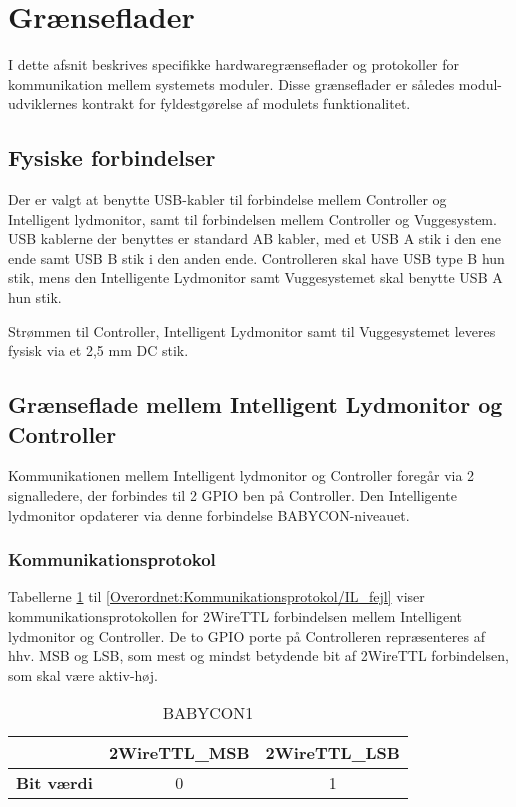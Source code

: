 \section{Grænseflader}
I dette afsnit beskrives specifikke hardwaregrænseflader og protokoller for kommunikation mellem systemets moduler. Disse grænseflader er således modul-udviklernes kontrakt for fyldestgørelse af modulets funktionalitet.

\subsection{Fysiske forbindelser}

Der er valgt at benytte USB-kabler til forbindelse mellem Controller og Intelligent lydmonitor, samt til forbindelsen mellem Controller og Vuggesystem. USB kablerne der benyttes er standard AB kabler, med et USB A stik i den ene ende samt USB B stik i den anden ende. Controlleren skal have USB type B hun stik, mens den Intelligente Lydmonitor samt Vuggesystemet skal benytte USB A hun stik. 

Strømmen til Controller, Intelligent Lydmonitor samt til Vuggesystemet leveres fysisk via et 2,5 mm DC stik.

\subsection{Grænseflade mellem Intelligent Lydmonitor og Controller}
\label{overordnet:graenseflade_IL}
Kommunikationen mellem Intelligent lydmonitor og Controller foregår via 2 signalledere, der forbindes til 2 GPIO ben på Controller. Den Intelligente lydmonitor opdaterer via denne forbindelse BABYCON-niveauet.  

\subsubsection{Kommunikationsprotokol}
\label{overordnet:Kommunikationsprotokol}

Tabellerne \ref{Overordnet:Kommunikationsprotokol/BABYCON1} til \ref{Overordnet:Kommunikationsprotokol/IL_fejl} viser kommunikationsprotokollen for 2WireTTL forbindelsen mellem Intelligent lydmonitor og Controller. De to GPIO porte på Controlleren repræsenteres af hhv. MSB og LSB, som mest og mindst betydende bit af 2WireTTL forbindelsen, som skal være aktiv-høj.

\begin{table}[H]
	\caption{BABYCON1 }
	\centering
	\begin{tabular}{|l|c|c|}
		\hline 
			&\textbf{2WireTTL\_MSB} & \textbf{2WireTTL\_LSB}     \\ 
		\hline 
		\textbf{Bit værdi} &0 & 1     \\ 
		\hline
	\end{tabular} 
	\label{Overordnet:Kommunikationsprotokol/BABYCON1}
\end{table}

